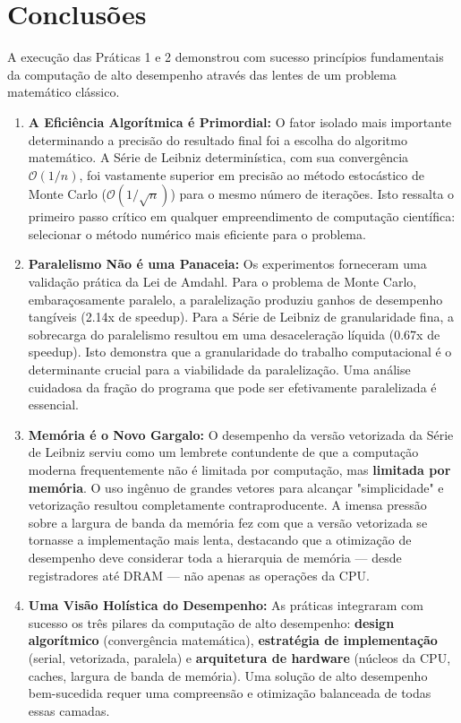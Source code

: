 \documentclass[12pt, a4paper]{article}
\begin{document}
	\section{Conclusões}
	
	A execução das Práticas 1 e 2 demonstrou com sucesso princípios fundamentais da
	computação de alto desempenho através das lentes de um problema matemático clássico.
	
	\begin{enumerate}
		\item \textbf{A Eficiência Algorítmica é Primordial:} O fator isolado mais
		importante determinando a precisão do resultado final foi a escolha do
		algoritmo matemático. A Série de Leibniz determinística, com sua convergência
		\(\mathcal{O}(1/n)\), foi vastamente superior em precisão ao método estocástico
		de Monte Carlo (\(\mathcal{O}(1/\sqrt{n})\)) para o mesmo número de iterações.
		Isto ressalta o primeiro passo crítico em qualquer empreendimento de
		computação científica: selecionar o método numérico mais eficiente para o
		problema.
		
		\item \textbf{Paralelismo Não é uma Panaceia:} Os experimentos forneceram
		uma validação prática da Lei de Amdahl. Para o problema de Monte Carlo,
		embaraçosamente paralelo, a paralelização produziu ganhos de desempenho
		tangíveis (2.14x de speedup). Para a Série de Leibniz de granularidade fina,
		a sobrecarga do paralelismo resultou em uma desaceleração líquida (0.67x de
		speedup). Isto demonstra que a granularidade do trabalho computacional é o
		determinante crucial para a viabilidade da paralelização. Uma análise cuidadosa
		da fração do programa que pode ser efetivamente paralelizada é essencial.
		
		\item \textbf{Memória é o Novo Gargalo:} O desempenho da versão vetorizada
		da Série de Leibniz serviu como um lembrete contundente de que a computação
		moderna frequentemente não é limitada por computação, mas \textbf{limitada
			por memória}. O uso ingênuo de grandes vetores para alcançar "simplicidade"
		e vetorização resultou completamente contraproducente. A imensa pressão
		sobre a largura de banda da memória fez com que a versão vetorizada se
		tornasse a implementação mais lenta, destacando que a otimização de
		desempenho deve considerar toda a hierarquia de memória — desde registradores
		até DRAM — não apenas as operações da CPU.
		
		\item \textbf{Uma Visão Holística do Desempenho:} As práticas integraram
		com sucesso os três pilares da computação de alto desempenho: \textbf{design
			algorítmico} (convergência matemática), \textbf{estratégia de implementação}
		(serial, vetorizada, paralela) e \textbf{arquitetura de hardware} (núcleos
		da CPU, caches, largura de banda de memória). Uma solução de alto desempenho
		bem-sucedida requer uma compreensão e otimização balanceada de todas essas
		camadas.
	\end{enumerate}
	
\end{document}
